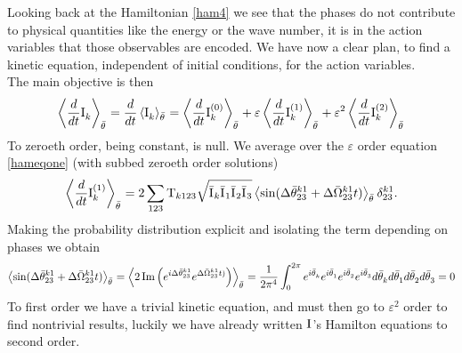 Looking back at the Hamiltonian \eqref{ham4} we see that the phases do not contribute to physical quantities like the energy or the wave number, 
it is in the action variables that those observables are encoded. We have now a clear plan, to find a kinetic equation, independent of initial conditions, for
the action variables. \\
The main objective is then
\begin{equation}
    \left\langle \frac{d}{dt} \mathrm{I}^{}_k \right\rangle_{\bar{\theta}^{}} = \frac{d}{dt} \left\langle \mathrm{I}^{}_k \right\rangle_{\bar{\theta}^{}} = \left\langle \frac{d}{dt} \mathrm{I}^{(0)}_k \right\rangle_{\bar{\theta}^{}}+
    \varepsilon\left\langle \frac{d}{dt} \mathrm{I}^{(1)}_k \right\rangle_{\bar{\theta}^{}} + \varepsilon^2\left\langle \frac{d}{dt} \mathrm{I}^{(2)}_k \right\rangle_{\bar{\theta}^{}} 
    \label{kineticexp}
\end{equation}
To zeroeth order, being constant, is null. We average over the $\varepsilon$ order equation \eqref{hameqone} (with subbed zeroeth order solutions)
\begin{equation}
    \left\langle \frac{d}{dt} \mathrm{I}^{(1)}_k \right\rangle_{\bar{\theta}^{}} = 2\sum_{123} \mathrm{T}_{k123} \sqrt{\bar{\mathrm{I}^{}}_k\bar{\mathrm{I}^{}}_1\bar{\mathrm{I}^{}}_2\bar{\mathrm{I}^{}}_3} \left\langle\sin(\Delta\bar{\theta}^{k1}_{23} +
    \Delta\bar{\Omega}^{k1}_{23}t)\right\rangle_{\bar{\theta}^{}}\delta^{k1}_{23}.
\end{equation}
Making the probability distribution explicit and isolating the term depending on phases we obtain
\begin{multline}
    \left\langle\sin(\Delta\bar{\theta}^{k1}_{23} + \Delta\bar{\Omega}^{k1}_{23}t)\right\rangle_{\bar{\theta}^{}} = 
    \left\langle 2 \operatorname{Im}\left(e^{i\Delta\bar{\theta}^{k1}_{23}}e^{\Delta\bar{\Omega}^{k1}_{23}t)} \right)   \right\rangle_{\bar{\theta}^{}} = 
    \frac{1}{2\pi^4}\int_{0}^{2\pi}  e^{i\bar{\theta}^{}_k}e^{i\bar{\theta}^{}_1}e^{i\bar{\theta}^{}_2}e^{i\bar{\theta}^{}_3} d \bar{\theta}^{}_k d \bar{\theta}^{}_1 d \bar{\theta}^{}_2 d \bar{\theta}^{}_3 = 0
\end{multline}
To first order we have a trivial kinetic equation, and must then go to $\varepsilon^2$ order to find nontrivial results, luckily we have already written $\mathrm{I}^{}$'s 
Hamilton equations to second order. \\

